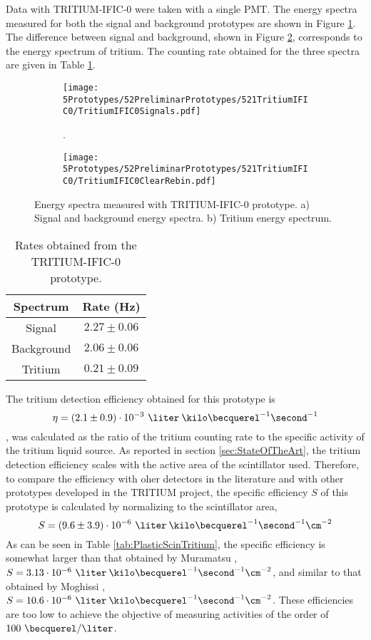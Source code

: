 Data with TRITIUM-IFIC-0 were taken with a single PMT. The energy spectra measured for both the signal and background prototypes are shown in Figure \ref{subfig:SignalBackgroundEnergySpectraTritiumIFIC0}. The difference between signal and background, shown in Figure \ref{subfig:TritiumEnergySpectraTritiumIFIC0}, corresponds to the energy spectrum of tritium. The counting rate obtained for the three spectra are given in Table \ref{tab:CountsPerSecondTRITIUMIFIC0}.

\begin{figure}
\centering
    \begin{subfigure}[b]{1\textwidth}
    \centering
    \texttt{[image: 5Prototypes/52PreliminarPrototypes/521TritiumIFIC0/TritiumIFIC0Signals.pdf]}  
    \caption{.\label{subfig:SignalBackgroundEnergySpectraTritiumIFIC0}}
    \end{subfigure}
    \hfill
    \begin{subfigure}[b]{1\textwidth}
    \centering
    \texttt{[image: 5Prototypes/52PreliminarPrototypes/521TritiumIFIC0/TritiumIFIC0ClearRebin.pdf]}  
    \caption{\label{subfig:TritiumEnergySpectraTritiumIFIC0}}
    \end{subfigure}
 \caption{Energy spectra measured with TRITIUM-IFIC-0 prototype. a) Signal and background energy spectra. b) Tritium energy spectrum.}
 \label{fig:EnergySpectraTRITIUMIFIC0}
\end{figure}

\begin{table}[htbp]
\centering{}%
\begin{tabular}{cc}
\toprule 
Spectrum & Rate (Hz) \tabularnewline
\midrule
\midrule 
Signal & $2.27 \pm 0.06$ \tabularnewline
Background & $2.06 \pm 0.06$ \tabularnewline  
Tritium & $0.21 \pm 0.09$ \tabularnewline
\bottomrule
\end{tabular}
\caption{Rates obtained from the TRITIUM-IFIC-0 prototype.}
\label{tab:CountsPerSecondTRITIUMIFIC0}
\end{table}

The tritium detection efficiency obtained for this prototype is $$\eta=(2.1 \pm 0.9)\cdot{} 10^{-3}~\liter\:\kilo\becquerel^{-1}\second^{-1}$$, was calculated as the ratio of the tritium counting rate to the specific activity of the tritium liquid source. As reported in section \ref{sec:StateOfTheArt}, the tritium detection efficiency scales with the active area of the scintillator used. Therefore, to compare the efficiency with oher detectors in the literature and with other prototypes developed in the TRITIUM project, the specific efficiency $S$ of this prototype is calculated by normalizing to the scintillator area,
$$S = (9.6 \pm 3.9)\cdot{} 10^{-6}~\liter\:\kilo\becquerel^{-1}\second^{-1}\cm^{-2}$$
As can be seen in Table \ref{tab:PlasticScinTritium}, the specific efficiency is somewhat larger than that obtained by Muramatsu \cite{Muramatsu}, $S=3.13 \cdot{} 10^{-6}~\liter\:\kilo\becquerel^{-1}\second^{-1}\cm^{-2}$, and similar to that obtained by Moghissi \cite{Moghissi}, $S=10.6 \cdot{} 10^{-6}~\liter\:\kilo\becquerel^{-1}\second^{-1}\cm^{-2}$. These efficiencies are too low to achieve the objective of measuring activities of the order of $100~\becquerel/\liter$. 

